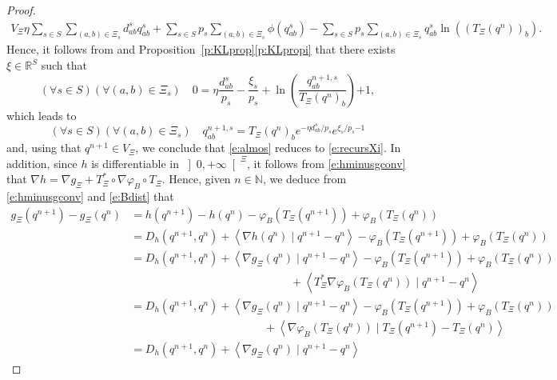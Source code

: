 \documentclass[smallextended,referee,envcountsect,]{svjour3}
\newcommand{\RPP}{\ensuremath{\left]0,+\infty\right[}}
\newcommand{\NN}{{\mathbb N}}
\newcommand{\R}{{\mathbb R}}
\newcommand{\scal}[2]{{\left\langle{{#1}\mid{#2}}\right\rangle}}
\begin{document}
\begin{proof}
{\begin{align}
{V_{\Xi}}\eta\sum_{s\in S}\sum_{(a,b)\in\Xi_s}d_{ab}^sq_{ab}^s+
\sum_{s\in S}p_s\sum_{(a,b)\in\Xi_s}\phi(q_{ab}^s)-\sum_{s\in 
S}p_s\sum_{(a,b)\in\Xi_s}q_{ab}^{s}\ln\left((T_{\Xi}(q^n))_b\right).
\end{align}}
Hence, it follows from  
{\cite[Theorem~28.2]{rockafellar1997convex}} and 
Proposition~\ref{p:KLprop}\eqref{p:KLpropi} that there exists 
$\xi\in\R^S$ such that
\begin{equation}
(\forall s\in S)(\forall (a,b)\in\Xi_s)\quad 0=\eta 
\frac{d_{ab}^s}{p_s}-\frac{\xi_s}{p_s}+
\ln\left(\frac{q_{ab}^{n+1,s}}{T{_{\Xi}}(q^n)_b}\right) {+1 },
\end{equation}
{which leads to}
\begin{equation}
\label{e:almos}
(\forall s\in S)(\forall (a,b)\in\Xi_s)\quad
q_{ab}^{n+1,s}=T{_{\Xi}}(q^n)_be^{-\eta d_{ab}^s/p_s}
e^{\xi_s/p_s{-1}}
\end{equation}
and,  { using that $q^{n+1}\in V_{\Xi}$, we conclude 
that \eqref{e:almos} reduces to \eqref{e:recursXi}.
In addition, since $h$ is differentiable in $\RPP^{\Xi}$,
it follows from \eqref{e:hminusgconv} that $\nabla 
h=\nabla g_{\Xi}+T_{\Xi}^*\circ\nabla\varphi_B\circ T_{\Xi}$. Hence,
given $n\in\NN$,
we deduce from \eqref{e:hminusgconv} and \eqref{e:Bdist} that
\begin{align}
\label{e:auxd}
g_{\Xi}(q^{n+1})-g_{\Xi}(q^{n})&=
h(q^{n+1})-h(q^n)-\varphi_B(T_{\Xi}(q^{n+1}))+\varphi_B(T_{\Xi}
(q^n))\nonumber\\
&=D_h(q^{n+1},q^n)+\scal{\nabla h(q^n)}{q^{n+1}-q^n}
-\varphi_B(T_{\Xi}(q^{n+1}))+\varphi_B(T_{\Xi}
(q^n))\nonumber\\
&=D_h(q^{n+1},q^n)+\scal{\nabla g_{\Xi}(q^n)}{q^{n+1}-q^n}
-\varphi_B(T_{\Xi}(q^{n+1}))+\varphi_B(T_{\Xi}
(q^n))\nonumber\\
&\hspace{6cm}+\scal{T_{\Xi}^*\nabla 
\varphi_B(T_{\Xi}(q^n))}{q^{n+1}-q^n}\nonumber\\
&=D_h(q^{n+1},q^n)+\scal{\nabla g_{\Xi}(q^n)}{q^{n+1}-q^n}
-\varphi_B(T_{\Xi}(q^{n+1}))+\varphi_B(T_{\Xi}
(q^n))\nonumber\\
&\hspace{5cm}+\scal{\nabla 
\varphi_B(T_{\Xi}(q^n))}{T_{\Xi}(q^{n+1})-T_{\Xi}(q^n)}\nonumber\\
&=D_h(q^{n+1},q^n)+\scal{\nabla g_{\Xi}(q^n)}{q^{n+1}-q^n}

\end{align}}
\end{proof}
\end{document}
